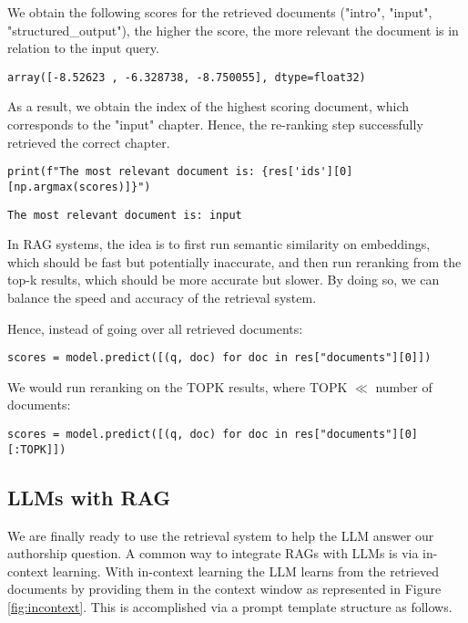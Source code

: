 We obtain the following scores for the retrieved documents ("intro", "input", "structured\_output"), the higher the score, the more relevant the document is in relation to the input query.

\begin{verbatim}
array([-8.52623 , -6.328738, -8.750055], dtype=float32)
\end{verbatim}

As a result, we obtain the index of the highest scoring document, which corresponds to the "input" chapter. Hence, the re-ranking step successfully retrieved the correct chapter.

\begin{verbatim}
print(f"The most relevant document is: {res['ids'][0][np.argmax(scores)]}")
\end{verbatim}

\begin{verbatim}
The most relevant document is: input
\end{verbatim}

In RAG systems, the idea is to first run semantic similarity on embeddings, which should be fast but potentially inaccurate, and then run reranking from the top-k results, which should be more accurate but slower. By doing so, we can balance the speed and accuracy of the retrieval system.

Hence, instead of going over all retrieved documents:
\begin{verbatim}
scores = model.predict([(q, doc) for doc in res["documents"][0]])
\end{verbatim}
We would run reranking on the TOPK results, where TOPK $\ll$ number of documents:
\begin{verbatim}
scores = model.predict([(q, doc) for doc in res["documents"][0][:TOPK]])
\end{verbatim}

\subsection{LLMs with RAG}

We are finally ready to use the retrieval system to help the LLM answer our authorship question. A common way to integrate RAGs with LLMs is via in-context learning. With in-context learning the LLM learns from the retrieved documents by providing them in the context window as represented in Figure \ref{fig:incontext}. This is accomplished via a prompt template structure as follows.


